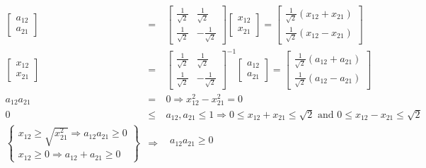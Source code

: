\documentclass{article}
\begin{document}
\begin{eqnarray*}
\left[ 
\begin{array}{c}
a_{12} \\ 
a_{21}%
\end{array}%
\right]  &=&\left[ 
\begin{array}{cc}
\frac{1}{\sqrt{2}} & \frac{1}{\sqrt{2}} \\ 
\frac{1}{\sqrt{2}} & -\frac{1}{\sqrt{2}}%
\end{array}%
\right] \left[ 
\begin{array}{c}
x_{12} \\ 
x_{21}%
\end{array}%
\right] =\left[ 
\begin{array}{c}
\frac{1}{\sqrt{2}}\left( x_{12}+x_{21}\right)  \\ 
\frac{1}{\sqrt{2}}\left( x_{12}-x_{21}\right) 
\end{array}%
\right]  \\
\left[ 
\begin{array}{c}
x_{12} \\ 
x_{21}%
\end{array}%
\right]  &=&\left[ 
\begin{array}{cc}
\frac{1}{\sqrt{2}} & \frac{1}{\sqrt{2}} \\ 
\frac{1}{\sqrt{2}} & -\frac{1}{\sqrt{2}}%
\end{array}%
\right] ^{-1}\left[ 
\begin{array}{c}
a_{12} \\ 
a_{21}%
\end{array}%
\right] =\left[ 
\begin{array}{c}
\frac{1}{\sqrt{2}}\left( a_{12}+a_{21}\right)  \\ 
\frac{1}{\sqrt{2}}\left( a_{12}-a_{21}\right) 
\end{array}%
\right]  \\
a_{12}a_{21} &=&0\Longrightarrow x_{12}^{2}-x_{21}^{2}=0 \\
0 &\leq &a_{12},a_{21}\leq 1\Longrightarrow 0\leq x_{12}+x_{21}\leq \sqrt{2}%
\text{ and }0\leq x_{12}-x_{21}\leq \sqrt{2} \\
\left\{ 
\begin{array}{c}
x_{12}\geq \sqrt{x_{21}^{2}}\Longrightarrow a_{12}a_{21}\geq 0 \\ 
x_{12}\geq 0\Longrightarrow a_{12}+a_{21}\geq 0%
\end{array}%
\right\}  &\Longrightarrow &%
\begin{array}{c}
a_{12}a_{21}\geq 0 \\ 

\end{array}
\end{eqnarray*}
\end{document}
